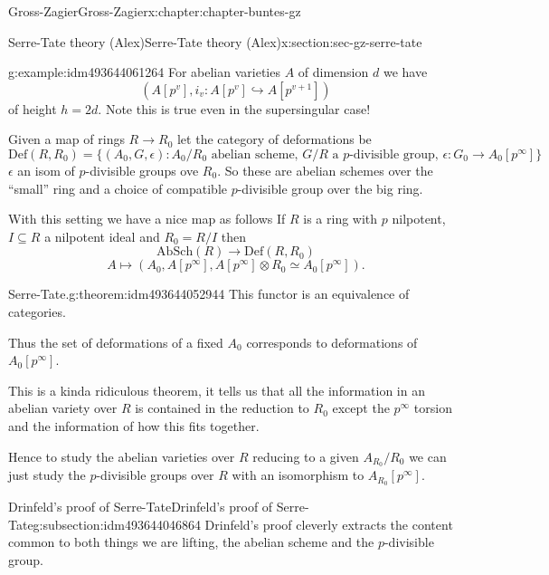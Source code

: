 \documentclass[oneside,10pt,]{book}
\numberwithin{equation}{section}
\newcommand{\lb}{[}
\newcommand{\rb}{]}
\begin{document}
\begin{chapterptx}{Gross-Zagier}{}{Gross-Zagier}{}{}{x:chapter:chapter-buntes-gz}
\begin{sectionptx}{Serre-Tate theory (Alex)}{}{Serre-Tate theory (Alex)}{}{}{x:section:sec-gz-serre-tate}
\begin{example}{}{g:example:idm493644061264}
For abelian varieties \(A\) of dimension \(d\) we have%
\begin{equation*}
(A[p^v], i_v\colon A[p^v] \hookrightarrow A[p^{v+1}])
\end{equation*}
of height \(h =2d\). Note this is true even in the supersingular case!%
\end{example}
Given a map of rings \(R \to R_0\) let the category of deformations be%
\begin{equation*}
\mathrm{Def}(R,R_0) =\{(A_0, G, \epsilon ) : A_0/R_0\text{ abelian scheme},\,G/R\text{ a }p\text{-divisible group},\,\epsilon \colon G_0 \to A_0 [p^\infty ]\}
\end{equation*}
\(\epsilon \) an isom of \(p\)-divisible groups ove \(R_0\). So these are abelian schemes over the ``small'' ring and a choice of compatible \(p\)-divisible group over the big ring.%
\par
With this setting we have a nice map as follows If \(R\) is a ring with \(p\) nilpotent, \(I \subseteq R\) a nilpotent ideal and \(R_0 = R/I\) then%
\begin{equation*}
\mathrm{AbSch}(R) \to \mathrm{Def}(R,R_0)
\end{equation*}
%
\begin{equation*}
A \mapsto (A_0, A[p^\infty ],A[p^\infty ]\otimes R_0 \simeq A_0 [p^\infty ])\text{.}
\end{equation*}
%
\begin{theorem}{Serre-Tate.}{}{g:theorem:idm493644052944}%
This functor is an equivalence of categories.%
\end{theorem}
Thus the set of deformations of a fixed \(A_0\) corresponds to deformations of \(A_0\lb p^\infty \rb \).%
\par
This is a kinda ridiculous theorem, it tells us that all the information in an abelian variety over \(R\) is contained in the reduction to \(R_0\) except the \(p^\infty\) torsion and the information of how this fits together.%
\par
Hence to study the abelian varieties over \(R\) reducing to a given \(A_{R_0}/R_0\) we can just study the \(p\)-divisible groups over \(R\) with an isomorphism to \(A_{R_0}\lb p^\infty\rb\).%
%
%
\typeout{************************************************}
\typeout{************************************************}
%
\begin{subsectionptx}{Drinfeld's proof of Serre-Tate}{}{Drinfeld's proof of Serre-Tate}{}{}{g:subsection:idm493644046864}
Drinfeld's proof cleverly extracts the content common to both things we are lifting, the abelian scheme and the \(p\)-divisible group.%

\end{subsectionptx}
\end{sectionptx}
\end{chapterptx}
\end{document}
